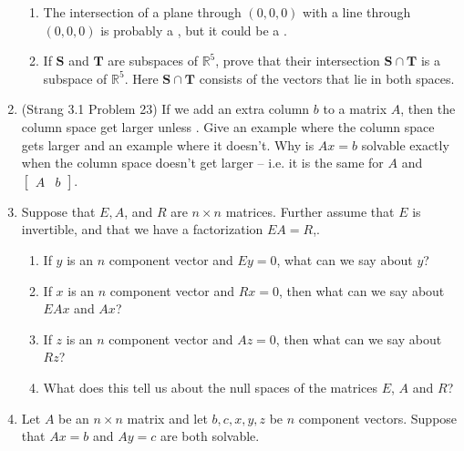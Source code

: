 \documentclass[11pt]{article}
\newcommand{\rr}{\mathbb{R}}
\begin{document}
\begin{enumerate}
\begin{enumerate}
\item The intersection of a plane through $(0,0,0)$ with a line through $(0,0,0)$ is probably a \underline{\phantom{aaaaaaaaaaaa}}, but it could be a \underline{\phantom{aaaaaaaaaaaa}} .

\item If $\mathbf{S}$ and $\mathbf{T}$ are subspaces of $\rr^5$, prove that their intersection $\mathbf{S} \cap \mathbf{T}$ is a subspace of $\rr^5$.  Here $\mathbf{S} \cap \mathbf{T}$ consists of the vectors that lie in both spaces.

\end{enumerate}

\item (Strang 3.1 Problem 23) If we add an extra column $b$ to a matrix $A$, then the column space get larger unless \underline{\phantom{aaaaaaaaaaaa}}.  Give an example where the column space gets larger and an example where it doesn't.  Why is $Ax = b$ solvable exactly when the column space doesn't get larger -- i.e. it is the same for $A$ and $\begin{bmatrix} A & b \end{bmatrix}$.

\item Suppose that $E, A$, and $R$ are $n\times n$ matrices.  Further assume that $E$ is invertible, and that we have a factorization $EA = R$,.

\begin{enumerate}
\item If $y$ is an $n$ component vector and $Ey = 0$, what can we say about $y$?
\item If $x$ is an $n$ component vector and $R x = 0$, then what can we say about $EAx$ and $Ax$?
\item If $z$ is an $n$ component vector and $Az = 0$, then what can we say about $Rz$?  
\item What does this tell us about the null spaces of the matrices $E$, $A$ and $R$?
\end{enumerate}

\item Let $A$ be an $n \times n$ matrix and let $b,c,x,y,z$ be $n$ component vectors.  Suppose that $Ax=b$ and $Ay=c$ are both solvable.  

\begin{enumerate}


\end{enumerate}
\end{enumerate}
\end{document}
